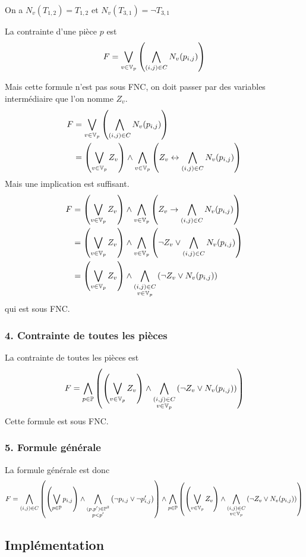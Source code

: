     On a $N_v(T_{1,2}) = T_{1,2}$ et $N_v(T_{3,1}) = \lnot T_{3,1}$
    
    La contrainte d'une pièce $p$ est
    \[F = \bigvee_{v\in\mathbb{V}_p} \left( \bigwedge_{(i,j)\in C} N_v(p_{i,j}) \right)\]
    
    Mais cette formule n'est pas sous FNC,
    on doit passer par des variables intermédiaire que l'on nomme $Z_v$.
    \begin{align*}
        F &= \bigvee_{v\in\mathbb{V}_p} \left( \bigwedge_{(i,j)\in C} N_v(p_{i,j}) \right)\\
        &= \left( \bigvee_{v\in\mathbb{V}_p} Z_v \right) \land \bigwedge_{v\in\mathbb{V}_p} \left(Z_v \leftrightarrow \bigwedge_{(i,j)\in C} N_v(p_{i,j}) \right)\\
    \end{align*}
    Mais une implication est suffisant.
    \begin{align*}
        F &= \left( \bigvee_{v\in\mathbb{V}_p} Z_v \right) \land \bigwedge_{v\in\mathbb{V}_p} \left(Z_v \to \bigwedge_{(i,j)\in C} N_v(p_{i,j}) \right)\\
        &= \left( \bigvee_{v\in\mathbb{V}_p} Z_v \right) \land \bigwedge_{v\in\mathbb{V}_p} \left(\lnot Z_v \lor \bigwedge_{(i,j)\in C} N_v(p_{i,j}) \right)\\
        &= \left( \bigvee_{v\in\mathbb{V}_p} Z_v \right) \land \bigwedge_{\substack{(i,j)\in C\\v\in\mathbb{V}_p}} \left(\lnot Z_v \lor N_v(p_{i,j}) \right)\\
    \end{align*}
    qui est sous FNC.
    
    \subsubsection*{4. Contrainte de toutes les pièces}
    La contrainte de toutes les pièces est
    \[F = \bigwedge_{p\in\mathbb{P}} \left(\left( \bigvee_{v\in\mathbb{V}_p} Z_v \right) \land
        \bigwedge_{\substack{(i,j)\in C\\v\in\mathbb{V}_p}} \left(\lnot Z_v \lor N_v(p_{i,j}) \right)\right)\]
    Cette formule est sous FNC.
    
    \subsubsection*{5. Formule générale}
    La formule générale est donc
    \[F = \bigwedge_{(i,j)\in C} \left(\left(\bigvee_{p\in\mathbb{P}} p_{i,j} \right) \land
        \bigwedge_{\substack{(p,p')\in\mathbb{P}^2\\p<p'}}\left(\lnot p_{i,j} \lor \lnot p'_{i,j}\right)\right) \land
        \bigwedge_{p\in\mathbb{P}} \left(\left( \bigvee_{v\in\mathbb{V}_p} Z_v \right) \land
        \bigwedge_{\substack{(i,j)\in C\\v\in\mathbb{V}_p}} \left(\lnot Z_v \lor N_v(p_{i,j}) \right)\right)\]
    
    \subsection*{Implémentation}

